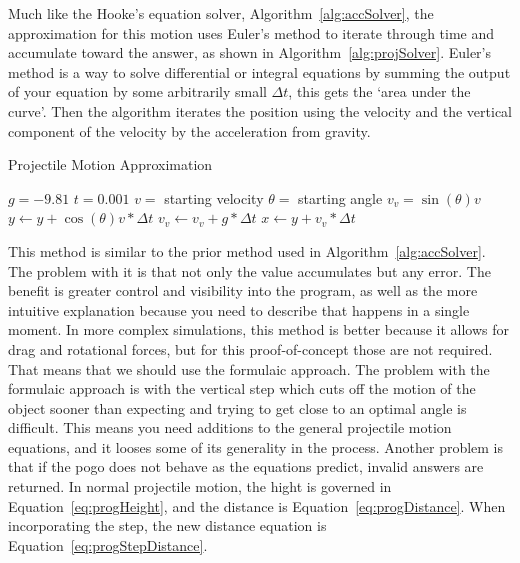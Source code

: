 \documentclass[12pt, letterpaper]{article}
\newcommand{\sorta}[1]{`#1'}
\newcommand{\poses}[1]{#1's}
\begin{document}
Much like the \poses{Hooke} equation solver, Algorithm~\ref{alg:accSolver}, the approximation for this motion
uses \poses{Euler} method to iterate through time and accumulate toward the answer, as shown in
Algorithm~\ref{alg:projSolver}. \poses{Euler} method is a way to solve differential or integral equations by
summing the output of your equation by some arbitrarily small $\Delta t$, this gets the \sorta{area under
the curve}. Then the algorithm iterates the position using the velocity and the vertical component of the 
velocity by the acceleration from gravity.

\begin{algorithm}
\caption{Projectile Motion Approximation}
\begin{algorithmic} 
\label{alg:projSolver}
\REQUIRE $g = -9.81$
\REQUIRE $t = 0.001$
\REQUIRE $v =$ starting velocity
\REQUIRE $\theta =$ starting angle
\REQUIRE $v_v = \sin(\theta) v$
\STATE $y \leftarrow  y + \cos(\theta) v * \Delta t$
\STATE $v_v \leftarrow  v_v + g * \Delta t$
\STATE $x \leftarrow  y + v_v * \Delta t$
\ENDWHILE
\end{algorithmic}
\end{algorithm}

This method is similar to the prior method used in Algorithm~\ref{alg:accSolver}. The problem with it is that
not only the value accumulates but any error. The benefit is greater control and visibility into
the program, as well as the more intuitive explanation because you need to describe that happens in a single
moment. In more complex simulations, this method is better because it allows for drag and rotational forces,
but for this proof-of-concept those are not required. That means that we should use the formulaic approach.
The problem with the formulaic approach is with the vertical step which cuts off the motion of the object
sooner than expecting and trying to get close to an optimal angle is difficult. This means you need additions
to the general projectile motion equations, and it looses some of its generality in the process. Another
problem is that if the pogo does not behave as the equations predict, invalid answers are returned. In normal
projectile motion, the hight is governed in Equation~\ref{eq:progHeight}, and the distance is 
Equation~\ref{eq:progDistance}. When incorporating the step, the new distance equation is 
Equation~\ref{eq:progStepDistance}.
\end{document}
